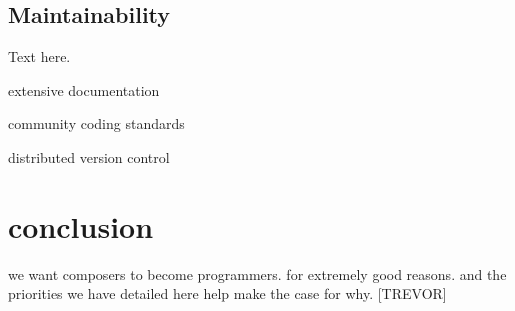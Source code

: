 \documentclass{article}
\begin{document}
\subsection{Maintainability}

Text here.

extensive documentation

community coding standards

distributed version control

\section{conclusion} \label{sec:conclusion}

we want composers to become programmers. for extremely good reasons. and the
priorities we have detailed here help make the case for why. [TREVOR]


\end{document}
